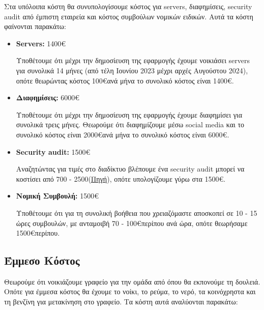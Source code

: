 \documentclass[12pt,a4paper]{article}
\begin{document}
Στα υπόλοιπα κόστη θα συνυπολογίσουμε κόστος για servers, διαφημίσεις, security audit από έμπιστη εταιρεία και κόστος συμβούλων νομικών ειδικών. Αυτά τα κόστη φαίνονται παρακάτω:

\begin{itemize}
	\item \textbf{Servers:} 1400\euro

		Υποθέτουμε ότι μέχρι την δημοσίευση της εφαρμογής έχουμε νοικιάσει servers για συνολικά 14 μήνες (από τέλη Ιουνίου 2023 μέχρι αρχές Αυγούστου 2024), οπότε θεωρώντας κόστος 100\euro\space ανά μήνα το συνολικό κόστος είναι 1400\euro.

	\item \textbf{Διαφημίσεις:} 6000\euro

		Υποθέτουμε ότι μέχρι την δημοσίευση της εφαρμογής έχουμε διαφημίσει για συνολικά τρεις μήνες. Θεωρούμε ότι διαφημίζουμε μέσω social media και το συνολικό κόστος είναι 2000\euro\space ανά μήνα το συνολικό κόστος είναι 6000\euro.

	\item \textbf{Security audit:} 1500\euro

		Αναζητώντας για τιμές στο διαδίκτυο βλέπουμε ένα security audit μπορεί να κοστίσει από 700 - 2500\textdollar\space (\href{https://www.getastra.com/blog/security-audit/it-security-audit-cost/}{\color{blue}Πηγή}), οπότε υπολογίζουμε γύρω στα 1500\euro.

	\item \textbf{Νομική Συμβουλή:} 1500\euro

		Υποθέτουμε ότι για τη συνολική βοήθεια που χρειαζόμαστε αποσκοπεί σε 10 - 15 ώρες συμβουλών, με ανταμοιβή 70 - 100\euro\space περίπου ανά ώρα, οπότε θεωρήσαμε 1500\euro\space περίπου.
\end{itemize}

\subsection{Έμμεσο Κόστος}

Θεωρούμε ότι νοικιάζουμε γραφείο για την ομάδα από όπου θα εκπονούμε τη δουλειά. Οπότε για έμμεσα κόστος θα έχουμε το νοίκι, το ρεύμα, το νερό, τα κοινόχρηστα και τη βενζίνη για μετακίνηση στο γραφείο. Τα κόστη αυτά αναλύονται παρακάτω:
\end{document}
